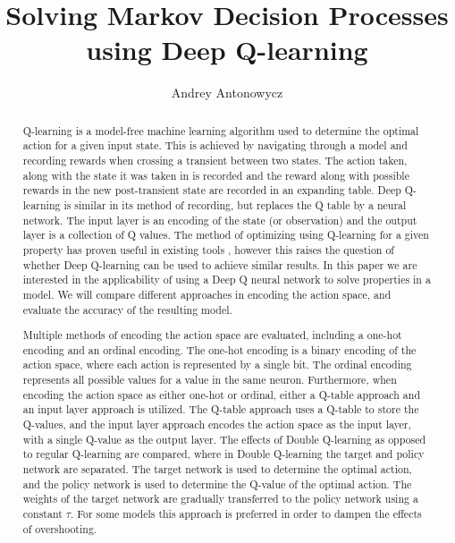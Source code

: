 \documentclass[runningheads]{llncs}
\begin{document}
%
\title{Solving Markov Decision Processes using Deep Q-learning}
%
%
\author{Andrey Antonowycz}
%
%
%
\maketitle %
%
\begin{abstract}
Q-learning is a model-free machine learning algorithm used to determine the optimal action for a given input state. This is achieved by navigating through a model and recording rewards when crossing a transient between two states. The action taken, along with the state it was taken in is recorded and the reward along with possible rewards in the new post-transient state are recorded in an expanding table. Deep Q-learning is similar in its method of recording, but replaces the Q table by a neural network. The input layer is an encoding of the state (or observation) and the output layer is a collection of Q values. The method of optimizing using Q-learning for a given property has proven useful in existing tools \cite{modest}, however this raises the question of whether Deep Q-learning can be used to achieve similar results. In this paper we are interested in the applicability of using a Deep Q neural network to solve properties in a model. We will compare different approaches in encoding the action space, and evaluate the accuracy of the resulting model.

Multiple methods of encoding the action space are evaluated, including a one-hot encoding and an ordinal encoding. The one-hot encoding is a binary encoding of the action space, where each action is represented by a single bit. The ordinal encoding represents all possible values for a value in the same neuron. Furthermore, when encoding the action space as either one-hot or ordinal, either a Q-table approach and an input layer approach is utilized. The Q-table approach uses a Q-table to store the Q-values, and the input layer approach encodes the action space as the input layer, with a single Q-value as the output layer. The effects of Double Q-learning as opposed to regular Q-learning are compared, where in Double Q-learning the target and policy network are separated. The target network is used to determine the optimal action, and the policy network is used to determine the Q-value of the optimal action. The weights of the target network are gradually transferred to the policy network using a constant $\tau$. For some models this approach is preferred in order to dampen the effects of overshooting.

\end{abstract}
%
%
%
\newpage







\end{document}
